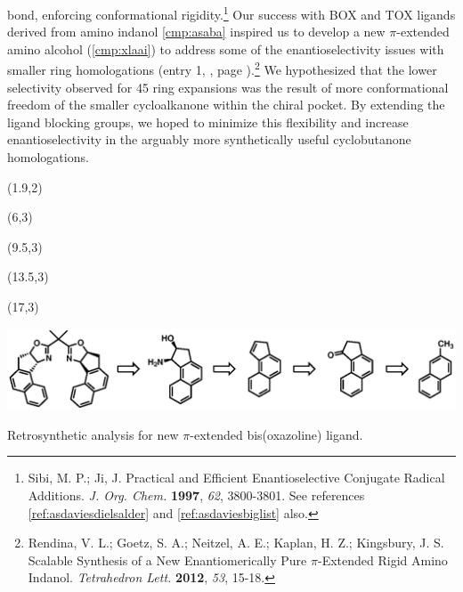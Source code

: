  bond, enforcing conformational rigidity.\footnote{{\frenchspacing Sibi, M. P.; Ji, J.
Practical and Efficient Enantioselective Conjugate Radical Additions. \textit{J. Org. Chem.}
\textbf{1997}, \textit{62}, 3800-3801.} See references \ref{ref:asdaviesdielsalder} and
\ref{ref:asdaviesbiglist} also.} Our success with BOX and TOX ligands derived from amino indanol
\ref{cmp:asaba} inspired us to develop a new $\pi$-extended amino alcohol (\ref{cmp:xlaai}) to
address some of the enantioselectivity issues with smaller ring homologations (entry 1,
, page \pageref{tbl:assubstrates}).\footnote{{\frenchspacing Rendina, V. L.; Goetz, S. A.;
Neitzel, A. E.; Kaplan, H. Z.; Kingsbury, J. S. Scalable Synthesis of a New Enantiomerically Pure $\pi$-Extended Rigid Amino
Indanol.
\textit{Tetrahedron Lett.} \textbf{2012}, \textit{53}, 15-18.}} We hypothesized that the lower
selectivity observed for  4\ce{->}5 ring expansions was the result of more conformational
freedom of the smaller cycloalkanone within the chiral pocket. By extending the ligand blocking
groups, we hoped to minimize this flexibility and increase enantioselectivity in the arguably more
synthetically useful cyclobutanone homologations. 
\begin{Scheme}[h]
  \centering
   \begin{textblock}{1}(1.9,2)  \end{textblock}
  \begin{textblock}{1}(6,3)  \end{textblock}
   \begin{textblock}{1}(9.5,3)  \end{textblock}
    \begin{textblock}{1}(13.5,3)  \end{textblock}
    \begin{textblock}{1}(17,3)  \end{textblock}
  \includegraphics[scale=0.8]{chp_asymmetric/images/ligandretro}
  \caption{Retrosynthetic analysis for new $\pi$-extended bis(oxazoline) ligand.}
  \label{sch:asligandretro}
\end{Scheme}



